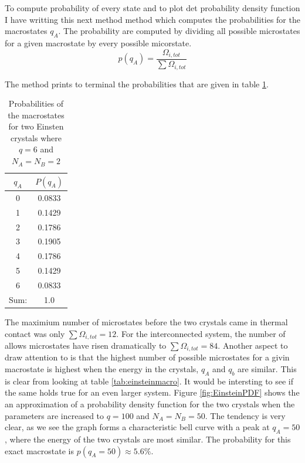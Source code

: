 \documentclass[10pt,a4paper]{amsart}
\begin{document}


To compute probability of every state and to plot det probability density function I have writting this next method method which computes the probabilities for the macrostates $q_A$. The probability are computed by dividing all possible microstates for a given macrostate by every possible micorstate.
\begin{equation}
p(q_A)=\frac{\Omega_{i,tot}}{\sum\Omega_{i,tot}}
\end{equation}


The method prints to terminal the probabilities that are given in table \ref{tab:einsteinprobs}.
\begin{table}[h]
\caption{Probabilities of the macrostates for two Einsten crystals where $q=6$ and $N_A=N_B=2$}
\begin{tabular}{cc} \hline
 $q_A$ & $P(q_A)$ \\ \hline
 0 & 0.0833 \\
 1 & 0.1429 \\
 2 & 0.1786 \\
 3 & 0.1905 \\
 4 & 0.1786 \\
 5 & 0.1429 \\
 6 & 0.0833 \\ \hline
 Sum: & 1.0 \\ \hline
\end{tabular}
\label{tab:einsteinprobs}
\end{table}

The maximium number of microstates before the two crystals came in thermal contact was only $\sum\Omega_{i,tot}=12$. For the interconnected system, the number of allows microstates have risen dramatically to $\sum\Omega_{i,tot}=84$. Another aspect to draw attention to is that the highest number of possible microstates for a givin macrostate is highest when the energy in the crystals, $q_A$ and $q_b$ are similar. This is clear from looking at table \ref{tab:einsteinmacro}. It would be intersting to see if the same holds true for an even larger system. Figure \ref{fig:EinsteinPDF} shows the an approximation of a probability density function for the two crystals when the parameters are increased to $q=100$ and $N_A=N_B=50$. The tendency is very clear, as we see the graph forms a characteristic bell curve with a peak at $q_A=50$, where the energy of the two crystals are most similar. The probability for this exact macrostate is $p(q_A=50) \approx 5.6\%$.
\end{document}
